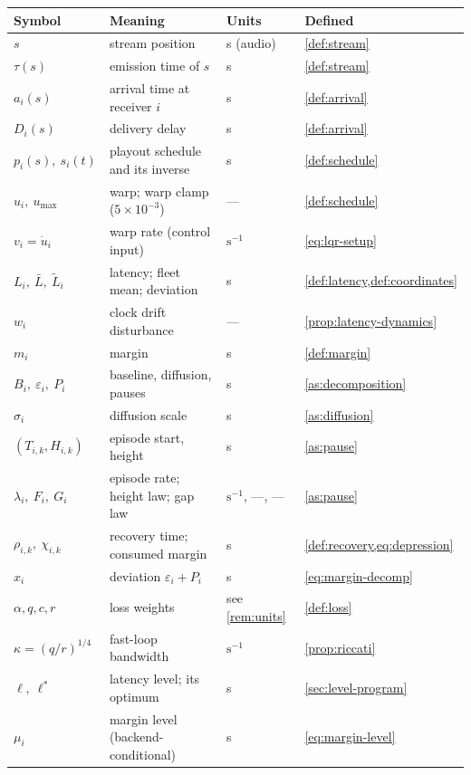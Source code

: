\documentclass[11pt, a4paper]{article}
\theoremstyle{definition}
\theoremstyle{plain}
\theoremstyle{remark}
\newcommand{\Lbar}{\bar{L}}
\newcommand{\Ltil}[1]{\tilde{L}_{#1}}
\begin{document}
\begin{table}[h!]
\centering
\small
\begin{tabular}{@{}llll@{}}
\toprule
Symbol & Meaning & Units & Defined \\
\midrule
$s$ & stream position & s (audio) & \cref{def:stream} \\
$\tau(s)$ & emission time of $s$ & s & \cref{def:stream} \\
$a_i(s)$ & arrival time at receiver $i$ & s & \cref{def:arrival} \\
$D_i(s)$ & delivery delay & s & \cref{def:arrival} \\
$p_i(s),\ s_i(t)$ & playout schedule and its inverse & s &
  \cref{def:schedule} \\
$u_i,\ u_{\max}$ & warp; warp clamp ($5\times10^{-3}$) & --- &
  \cref{def:schedule} \\
$v_i = \dot u_i$ & warp rate (control input) & $\mathrm{s}^{-1}$ &
  \cref{eq:lqr-setup} \\
$L_i,\ \Lbar,\ \Ltil{i}$ & latency; fleet mean; deviation & s &
  \cref{def:latency,def:coordinates} \\
$w_i$ & clock drift disturbance & --- & \cref{prop:latency-dynamics} \\
$m_i$ & margin & s & \cref{def:margin} \\
$B_i,\ \varepsilon_i,\ P_i$ & baseline, diffusion, pauses & s &
  \cref{as:decomposition} \\
$\sigma_i$ & diffusion scale & s & \cref{as:diffusion} \\
$(T_{i,k}, H_{i,k})$ & episode start, height & s & \cref{as:pause} \\
$\lambda_i,\ F_i,\ G_i$ & episode rate; height law; gap law &
  $\mathrm{s}^{-1}$, ---, --- & \cref{as:pause} \\
$\rho_{i,k},\ \chi_{i,k}$ & recovery time; consumed margin & s &
  \cref{def:recovery,eq:depression} \\
$x_i$ & deviation $\varepsilon_i + P_i$ & s & \cref{eq:margin-decomp} \\
$\alpha, q, c, r$ & loss weights &
  see \cref{rem:units} & \cref{def:loss} \\
$\kappa = (q/r)^{1/4}$ & fast-loop bandwidth & $\mathrm{s}^{-1}$ &
  \cref{prop:riccati} \\
$\ell,\ \ell^*$ & latency level; its optimum & s &
  \cref{sec:level-program} \\
$\mu_i$ & margin level (backend-conditional) & s &
  \cref{eq:margin-level} \\

\end{tabular}
\end{table}
\end{document}
